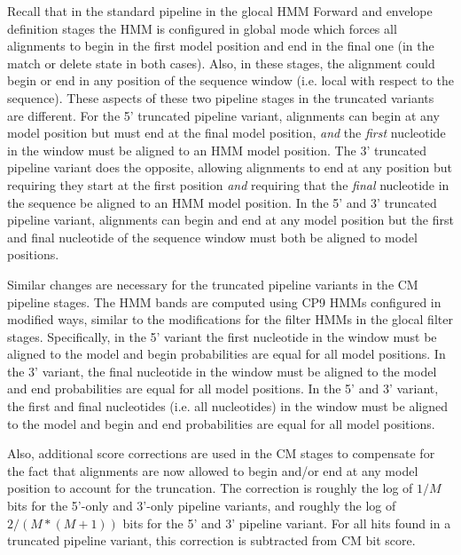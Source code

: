 \begin{sreoutput}
Recall that in the standard pipeline in the glocal HMM Forward and
envelope definition stages the HMM is configured in global mode which
forces all alignments to begin in the first model position and end in
the final one (in the match or delete state in both cases). Also, in
these stages, the alignment could begin or end in any position of the
sequence window (i.e. local with respect to the sequence).  These
aspects of these two pipeline stages in the truncated variants are
different. For the 5' truncated pipeline variant, alignments can begin
at any model position but must end at the final model position,
\emph{and} the \emph{first} nucleotide in the window must be aligned to an HMM
model position. The 3' truncated pipeline variant does the opposite,
allowing alignments to end at any position but requiring they start at
the first position \emph{and} requiring that the \emph{final} nucleotide
in the sequence be aligned to an HMM model position. 
In the 5' and 3' truncated pipeline variant, alignments can begin and
end at any model position but the first and final nucleotide of the
sequence window must both be aligned to model positions. 

Similar changes are necessary for the truncated pipeline variants in
the CM pipeline stages. The HMM bands are computed using CP9 HMMs
configured in modified ways, similar to the modifications for the
filter HMMs in the glocal filter stages. Specifically, in the 5'
variant the first nucleotide in the window must be aligned to the
model and begin probabilities are equal for all model positions. In
the 3' variant, the final nucleotide in the window must be aligned to
the model and end probabilities are equal for all model positions. In
the 5' and 3' variant, the first and final nucleotides (i.e. all
nucleotides) in the window must be aligned to the model and begin and
end probabilities are equal for all model positions.

Also, additional score corrections are used in the CM stages to
compensate for the fact that alignments are now allowed to begin
and/or end at any model position to account for the truncation. The
correction is roughly the log of $1/M$ bits for the 5'-only and
3'-only pipeline variants, and roughly the log of $2/(M*(M+1))$ bits
for the 5' and 3' pipeline variant. For all hits found in a truncated
pipeline variant, this correction is subtracted from CM bit score. 


\end{sreoutput}
